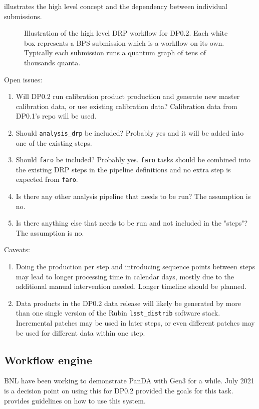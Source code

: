  illustrates the high level concept and the dependency between individual submissions.

\begin{figure}
\begin{center}

\end{center}
\caption{Illustration of the high level DRP workflow for DP0.2. Each white box represents a BPS submission which is a workflow on its own. Typically each submission runs a quantum graph of tens of thousands quanta.
\label{fig:highLevelWorkflow}}
\end{figure}

Open issues:
\begin{enumerate}
  \item Will DP0.2 run calibration product production and generate new master calibration data, or use existing calibration data?
Calibration data from DP0.1's repo will be used.
  \item Should \texttt{analysis\_drp} be included? Probably yes and it will be added into one of the existing steps.
  \item Should \texttt{faro} be included? Probably yes. \texttt{faro} tasks should be combined into the existing DRP steps in the pipeline definitions and no extra step is expected from \texttt{faro}.
  \item Is there any other analysis pipeline that needs to be run? The assumption is no.
  \item Is there anything else that needs to be run and not included in the "steps"? The assumption is no.
\end{enumerate}

Caveats:
\begin{enumerate}
  \item Doing the production per step and introducing sequence points between steps may lead to longer processing time in calendar days, mostly due to the additional manual intervention needed. Longer timeline should be planned.
  \item Data products in the DP0.2 data release will likely be generated by more than one single version of the Rubin \texttt{lsst\_distrib} software stack. Incremental patches may be used in later steps, or even different patches may be used for different data within one step.
\end{enumerate}

\subsection {Workflow engine}
BNL have been working to demonstrate PanDA with Gen3 for a while. July 2021 is a decision point on using this for DP0.2
 provided the goals for this task.  provides guidelines on how to use this system.



